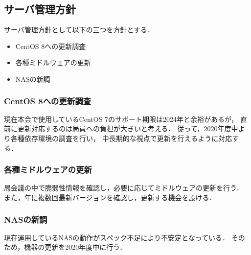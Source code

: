 \subsection*{サーバ管理方針}

サーバ管理方針として以下の三つを方針とする．
\begin{itemize}
    \item CentOS 8への更新調査
    \item 各種ミドルウェアの更新
    \item NASの新調
\end{itemize}

\subsubsection*{CentOS 8への更新調査}
現在本会で使用しているCentOS 7のサポート期限は2024年と余裕があるが，
直前に更新対応するのは局員への負担が大きいと考える．
従って，2020年度中より各種依存環境の調査を行い，
中長期的な視点で更新を行えるように対応する．

\subsubsection*{各種ミドルウェアの更新}
局会議の中で脆弱性情報を確認し，必要に応じてミドルウェアの更新を行う．
また，年に複数回最新バージョンを確認し，更新する機会を設ける．

\subsubsection*{NASの新調}
現在運用しているNASの動作がスペック不足により不安定となっている．
そのため，機器の更新を2020年度中に行う．
